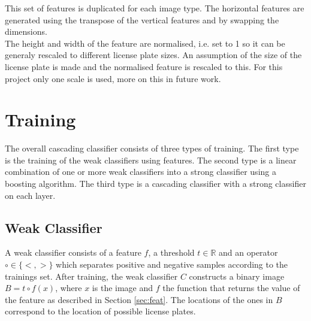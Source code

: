 \documentclass[a4paper,11pt]{article}
\begin{document}
This set of features is duplicated for each image type. The horizontal features
are generated using the transpose of the vertical features and by swapping the
dimensions.\\
The height and width of the feature are normalised, i.e. set to 1 so it can be
generaly rescaled to different license plate sizes.  An assumption of the
size of the license plate is made and the normalised feature is rescaled to
this. For this project only one scale is used, more on this in future work.\\



\section{Training} \label{sec:train}
The overall cascading classifier consists of three types of training. The first
type is the training of the weak classifiers using features. The second type is
a linear combination of one or more weak classifiers into a strong classifier
using a boosting algorithm. The third type is a cascading classifier
with a strong classifier on each layer.

\subsection{Weak Classifier} \label{sec:weak}
A weak classifier consists of a feature $f$, a threshold $t \in \mathbb{R}$ and
an operator $\circ \in \{<, >\}$ which separates positive and negative samples
according to the trainings set. After training, the weak classifier $C$
constructs a binary image $B = t \circ f(x)$, where $x$ is the image and $f$
the function that returns the value of the feature as described in Section
\ref{sec:feat}. The locations of the ones in $B$ correspond to the location of
possible license plates.
\end{document}
